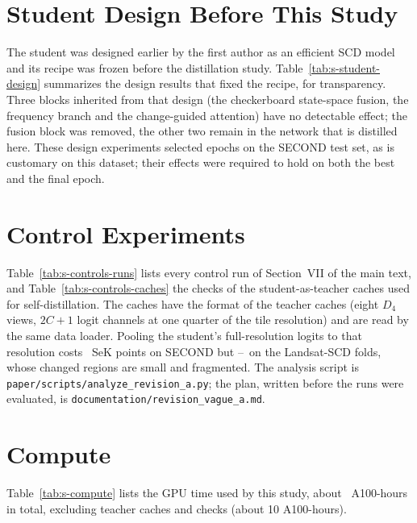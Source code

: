 \documentclass[journal,onecolumn,11pt]{IEEEtran}
\begin{document}


\section{Student Design Before This Study}
The student was designed earlier by the first author as an efficient SCD model and its recipe was
frozen before the distillation study. Table~\ref{tab:s-student-design} summarizes the design
results that fixed the recipe, for transparency. Three blocks inherited from that design (the
checkerboard state-space fusion, the frequency branch and the change-guided attention) have no
detectable effect; the fusion block was removed, the other two remain in the network that is
distilled here. These design experiments selected epochs on the SECOND test set, as is customary
on this dataset; their effects were required to hold on both the best and the final epoch.



\section{Control Experiments}
Table~\ref{tab:s-controls-runs} lists every control run of Section~VII of the main text, and
Table~\ref{tab:s-controls-caches} the checks of the student-as-teacher caches used for
self-distillation. The caches have the format of the teacher caches (eight $D_4$ views, $2C+1$ logit
channels at one quarter of the tile resolution) and are read by the same data loader. Pooling the
student's full-resolution logits to that resolution costs \RevCacheSecDrop\ SeK points on SECOND but
\RevCacheLanDropMin--\RevCacheLanDropMax\ on the Landsat-SCD folds, whose changed regions are small and fragmented. The analysis
script is \texttt{paper/scripts/analyze\_revision\_a.py}; the plan, written before the runs were
evaluated, is \texttt{documentation/revision\_vague\_a.md}.




\section{Compute}
Table~\ref{tab:s-compute} lists the GPU time used by this study, about \ComputeTotal\ A100-hours
in total, excluding teacher caches and checks (about 10 A100-hours).


\end{document}
